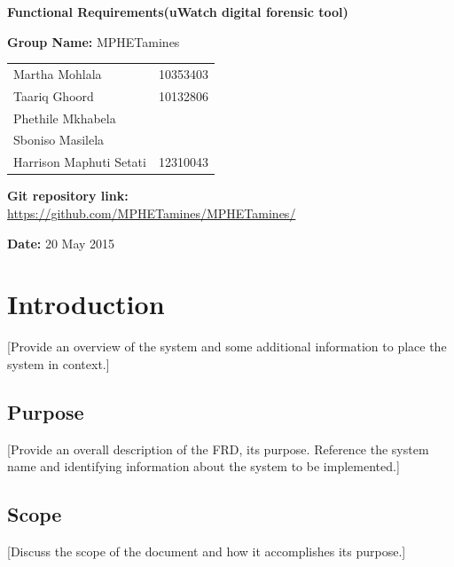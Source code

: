 \documentclass[a4paper,12pt]{article}
\begin{document}
\begin{center}

\Huge\textbf{Functional Requirements(uWatch digital forensic tool)\\}
																											
\vspace{2 cm}

\LARGE\textbf{Group Name:} MPHETamines\newline
 
 
 
 
 
\vspace{0.5 cm}
\begin{tabular}{lr}
Martha Mohlala&10353403
\\ 
Taariq Ghoord&10132806\\
Phethile Mkhabela&%
\\
Sboniso Masilela&%
\\
Harrison Maphuti Setati&12310043\\
\end{tabular}

\vspace{1cm}
\textbf{Git repository link:\\}
\url{https://github.com/MPHETamines/MPHETamines/}

\vspace{1cm}
\textbf{Date:} 20 May 2015
\end{center}
\newpage

\tableofcontents







\newpage
{}

\section{Introduction}
[Provide an overview of the system and some additional information to place the system in context.]
\subsection{Purpose}
[Provide an overall description of the FRD, its purpose.  Reference the system name and identifying information about the system to be implemented.]
\subsection{Scope}
[Discuss the scope of the document and how it accomplishes its purpose.]
\end{document}
